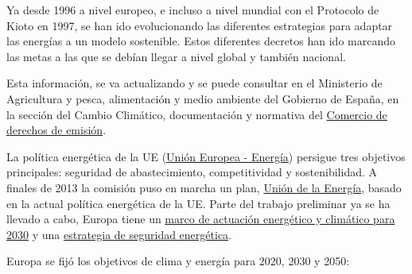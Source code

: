 Ya desde 1996 a nivel europeo, e incluso a nivel mundial con el
Protocolo de Kioto en 1997, se han ido evolucionando las diferentes
estrategias para adaptar las energías a un modelo sostenible. Estos
diferentes decretos han ido marcando las metas a las que se debían
llegar a nivel global y también nacional.

Esta información, se va actualizando y se puede consultar en el
Ministerio de Agricultura y pesca, alimentación y medio ambiente del
Gobierno de España, en la sección del Cambio Climático, documentación y
normativa del
\href{http://www.mapama.gob.es/es/cambio-climatico/temas/comercio-de-derechos-de-emision/documentacion-y-normativa/}{Comercio
de derechos de emisión}.

La política energética de la UE
(\href{https://europa.eu/european-union/topics/energy_es}{Unión Europea
- Energía}) persigue tres objetivos principales: seguridad de
abastecimiento, competitividad y sostenibilidad. A finales de 2013 la
comisión puso en marcha un plan,
\href{ec.europa.eu/priorities/energy-union-and-climate_es}{Unión de la
Energía}, basado en la actual política energética de la UE. Parte del
trabajo preliminar ya se ha llevado a cabo, Europa tiene un
\href{https://ec.europa.eu/energy/en/topics/energy-strategy-and-energy-union/2030-energy-strategy}{marco
de actuación energético y climático para 2030} y una
\href{https://ec.europa.eu/energy/en/topics/energy-strategy/energy-security-strategy}{estrategia
de seguridad energética}.

Europa se fijó los objetivos de clima y energía para 2020, 2030 y 2050:

